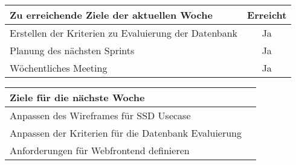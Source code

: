 \begin{tabularx}{\textwidth}{Xc}
    \arrayrulecolor{OliveGreen}
    \toprule
    {\bfseries Zu erreichende Ziele der aktuellen Woche} & {\bfseries Erreicht} \\
    \midrule[2pt]
    Erstellen der Kriterien zu Evaluierung der Datenbank  &Ja                \\
    \rowcolor{OliveGreen!15}
    Planung des nächsten Sprints                          &Ja                \\
    \rowcolor{White}
    Wöchentliches Meeting                                 &Ja                \\
   \bottomrule[2pt]
\end{tabularx}
%
\vspace{1cm}
%
\begin{tabularx}{\textwidth}{Xc}
    \arrayrulecolor{OliveGreen}
    \toprule
    {\bfseries Ziele für die nächste Woche}              &                   \\
    \midrule[2pt]
    Anpassen des Wireframes für SSD Usecase              &                   \\
    \rowcolor{OliveGreen!15}
    Anpassen der Kriterien für die Datenbank Evaluierung &                   \\
    \rowcolor{White}
    Anforderungen für Webfrontend definieren             &                   \\
\end{tabularx}
